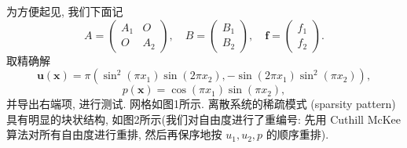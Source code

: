 \documentclass[lang=cn,11pt,a4paper]{elegantpaper}
\begin{document}
为方便起见, 我们下面记
\begin{equation}
    A = \begin{pmatrix}
        A_1 & O \\
        O & A_2
    \end{pmatrix},\quad 
    B = \begin{pmatrix}
        B_1 \\
        B_2
    \end{pmatrix}, \quad
    \mathbf{f} = \begin{pmatrix}
        f_1 \\
        f_2
    \end{pmatrix}.
\end{equation}
取精确解
\begin{equation}
    \mathbf{u}(\mathbf{x}) = \pi(\sin^2(\pi x_1)\sin(2\pi x_2),-\sin(2\pi x_1)\sin^2(\pi x_2)),
\end{equation}
\begin{equation}
    p(\mathbf{x}) = \cos(\pi x_1)\sin(\pi x_2),
\end{equation}
并导出右端项, 进行测试. 网格如图1所示. 离散系统的稀疏模式 
(sparsity pattern) 具有明显的块状结构, 
如图2所示(我们对自由度进行了重编号: 先用 Cuthill McKee 
算法对所有自由度进行重排, 
然后再保序地按 $u_1,u_2,p$ 的顺序重排). 
\end{document}
